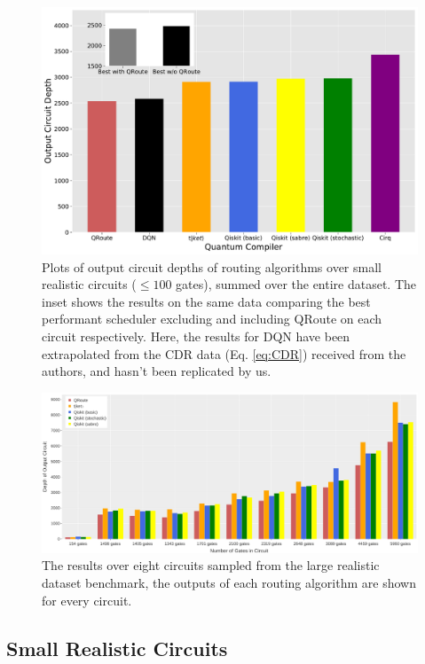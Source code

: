 \documentclass[%
 reprint,
 longbibliography,
 amsmath,amssymb,
 aps,
]{revtex4-2}
\begin{document}
\begin{figure}[t]
    \includegraphics[width=\linewidth]{images/realistic_small_benchmark.pdf}
    \caption{\label{fig:results-small}
        Plots of output circuit depths of routing algorithms over small realistic circuits ($\leq 100$ gates), summed over the entire dataset. The inset shows the results on the same data comparing the best performant scheduler excluding and including QRoute on each circuit respectively. Here, the results for DQN have been extrapolated from the CDR data (Eq. \ref{eq:CDR}) received from the authors, and hasn't been replicated by us.}
\end{figure}

\begin{figure}[ht]
    \includegraphics[width=\linewidth]{images/realistic_large_benchmark.pdf}
    \caption{\label{fig:results-large}
        The results over eight circuits sampled from the large realistic dataset benchmark, the outputs of each routing algorithm are shown for every circuit.}
\end{figure}

    
\subsection{\label{sec:results-small}Small Realistic Circuits}
\end{document}
